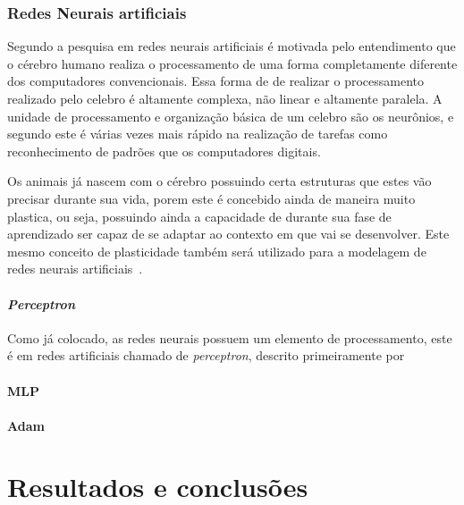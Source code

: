 \documentclass[
	12pt,
	oneside,
	a4paper,
	english,
	brazil
]{abntex2}
\begin{document}
\subsection{Redes Neurais artificiais}

Segundo  a pesquisa em redes neurais artificiais é motivada 
pelo entendimento que o cérebro humano realiza o processamento de uma forma 
completamente diferente dos computadores convencionais. Essa forma de de 
realizar o processamento realizado pelo celebro é altamente complexa, não linear 
e altamente paralela. A unidade de processamento e organização básica de um 
celebro são os neurônios, e segundo  este é várias vezes mais 
rápido na realização de tarefas como reconhecimento de padrões que os 
computadores digitais.

Os animais já nascem com o cérebro possuindo certa estruturas que estes vão 
precisar durante sua vida, porem este é concebido ainda de maneira muito 
plastica, ou seja, possuindo ainda a capacidade de durante sua fase de 
aprendizado ser capaz de se adaptar ao contexto em que vai se desenvolver. Este 
mesmo conceito de plasticidade também será utilizado para a modelagem de redes 
neurais artificiais~\cite{haykin}.

\subsubsection{\textit{Perceptron}}

Como já colocado, as redes neurais possuem um elemento de processamento, este é 
em redes artificiais chamado de \textit{perceptron}, descrito primeiramente por


\subsubsection{MLP}

\subsubsection{Adam}

\chapter{Resultados e conclusões}
\end{document}
